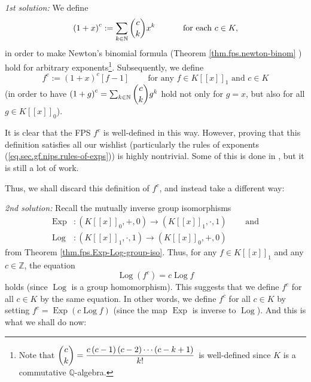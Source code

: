 \textit{1st solution:} We define
\[
\left(  1+x\right)  ^{c}:=\sum_{k\in\mathbb{N}}\dbinom{c}{k}x^{k}%
\ \ \ \ \ \ \ \ \ \ \text{for each }c\in K,
\]
in order to make Newton's binomial formula (Theorem \ref{thm.fps.newton-binom}%
) hold for arbitrary exponents\footnote{Note that $\dbinom{c}{k}%
=\dfrac{c\left(  c-1\right)  \left(  c-2\right)  \cdots\left(  c-k+1\right)
}{k!}$ is well-defined since $K$ is a commutative $\mathbb{Q}$-algebra.}.
Subsequently, we define%
\begin{equation}
f^{c}:=\left(  1+x\right)  ^{c}\left[  f-1\right]
\ \ \ \ \ \ \ \ \ \ \text{for any }f\in K\left[  \left[  x\right]  \right]
_{1}\text{ and }c\in K \label{eq.sec.gf.nips.newton-def2}%
\end{equation}
(in order to have $\left(  1+g\right)  ^{c}=\sum_{k\in\mathbb{N}}\dbinom{c}%
{k}g^{k}$ hold not only for $g=x$, but also for all $g\in K\left[  \left[
x\right]  \right]  _{0}$).

It is clear that the FPS $f^{c}$ is well-defined in this way. However, proving
that this definition satisfies all our wishlist (particularly the rules of
exponents (\ref{eq.sec.gf.nips.rules-of-exps})) is highly nontrivial. Some of
this is done in \cite[\S 7.12]{Loehr-BC}, but it is still a lot of work.

Thus, we shall discard this definition of $f^{c}$, and instead take a
different way: \medskip

\textit{2nd solution:} Recall the mutually inverse group isomorphisms%
\begin{align*}
\operatorname*{Exp}  &  :\left(  K\left[  \left[  x\right]  \right]
_{0},+,0\right)  \rightarrow\left(  K\left[  \left[  x\right]  \right]
_{1},\cdot,1\right)  \ \ \ \ \ \ \ \ \ \ \text{and}\\
\operatorname*{Log}  &  :\left(  K\left[  \left[  x\right]  \right]
_{1},\cdot,1\right)  \rightarrow\left(  K\left[  \left[  x\right]  \right]
_{0},+,0\right)
\end{align*}
from Theorem \ref{thm.fps.Exp-Log-group-iso}. Thus, for any $f\in K\left[
\left[  x\right]  \right]  _{1}$ and any $c\in\mathbb{Z}$, the equation%
\[
\operatorname*{Log}\left(  f^{c}\right)  =c\operatorname*{Log}f
\]
holds (since $\operatorname*{Log}$ is a group homomorphism). This suggests
that we define $f^{c}$ for all $c\in K$ by the same equation. In other words,
we define $f^{c}$ for all $c\in K$ by setting $f^{c}=\operatorname*{Exp}%
\left(  c\operatorname*{Log}f\right)  $ (since the map $\operatorname*{Exp}$
is inverse to $\operatorname*{Log}$). And this is what we shall do now:

